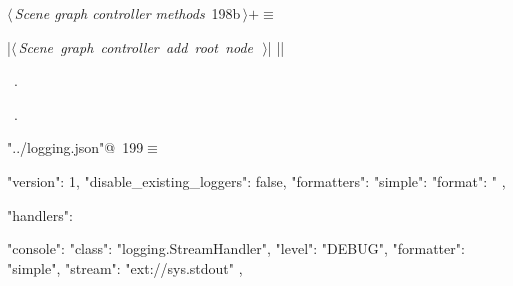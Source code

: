 \documentclass[%
    a4paper,    %
    justified,  %
    nobib,      %
    openany     %
]{tufte-book}
\makeatletter
\renewcommand{\label}[1]{\@tufte@label{##1}}%
\makeatother
\begin{document}
\begin{fullwidth}
\begin{flushleft}
\begin{minipage}{\linewidth}
\begin{list}{}{\setlength{\itemsep}{-\parsep}\setlength{\itemindent}{-\leftmargin}}
\item{}
\end{list}
\end{minipage}\vspace{4ex}
\end{flushleft}
\begin{flushleft} \small
\begin{minipage}{\linewidth}\label{scrap190}\raggedright\small
{} $\langle\,${\itshape Scene graph controller methods}\nobreak\ {\footnotesize {198b}}$\,\rangle+\equiv$
\vspace{-1ex}
\begin{pythoncode}
|\hbox{$\langle\,${\itshape Scene graph controller add root node}\nobreak\ {\footnotesize {}}$\,\rangle$}|
|\NWsep|
\end{pythoncode}
\vspace{1.5ex}
\footnotesize
\begin{list}{}{\setlength{\itemsep}{-\parsep}\setlength{\itemindent}{-\leftmargin}}
\item \NWtxtMacroDefBy\ .
\item \NWtxtMacroRefIn\ .

\item{}
\end{list}
\end{minipage}\vspace{4ex}
\end{flushleft}

\begin{flushleft} \small
\begin{minipage}{\linewidth}\label{scrap191}\raggedright\small
{} \verb@"../logging.json"@\nobreak\ {\footnotesize {199}}$\equiv$
\vspace{-1ex}
\begin{pythoncode}
{
    "version": 1,
    "disable_existing_loggers": false,
    "formatters": {
        "simple": {
            "format": "%
        }
    },

    "handlers": {
        "console": {
            "class": "logging.StreamHandler",
            "level": "DEBUG",
            "formatter": "simple",
            "stream": "ext://sys.stdout"
        },

}}
\end{pythoncode}
\end{minipage}
\end{flushleft}
\end{fullwidth}
\end{document}
